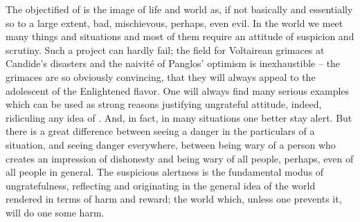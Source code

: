 The {objectified}  of  is the image of life and
world as, if not basically and essentially so to a large extent, bad,
mischievous, perhaps, even evil.  In the world we meet many things and
situations and most of them require an attitude of suspicion and scrutiny.  Such
a project can hardly fail; the field for Voltairean grimaces at Candide's
disasters and the naivit\'{e} of Panglos' optimism is inexhaustible -- the
grimaces are so obviously convincing, that they will always appeal to the
adolescent  of the Enlightened flavor.  One will always find
many serious examples which can be used as strong reasons justifying ungrateful
attitude, indeed, ridiculing any idea of .  And, in fact, in
many situations one better stay alert. But there is a great difference between
seeing a danger in the particulars of a situation, and seeing danger everywhere,
between being wary of a person who creates an impression of dishonesty and being
wary of all people, perhaps, even of all people in general.  The suspicious
alertness is the fundamental modus of ungratefulness, reflecting and originating
in the general idea of the world rendered in terms of harm and reward; the world
which, unless one prevents it, will do one some harm. 


